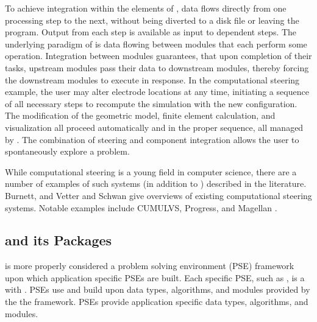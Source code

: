 To achieve integration within the elements of \SR{},
data flows  directly from one processing 
step to the next, without
being diverted to a disk file or leaving the program.  Output from
each step is available as input to dependent steps.  The underlying
paradigm of \SR{} is data flowing between modules that each perform
some operation.  Integration between modules guarantees, that upon
completion of their tasks, upstream modules pass their data to
downstream modules, thereby forcing the downstream modules to execute
in response.  In the computational steering example,  the user may alter
electrode locations at any time, initiating a sequence of all
necessary steps to recompute the simulation with the new
configuration.  The modification of the geometric model, finite
element calculation, and visualization all proceed automatically and
in the proper sequence, all managed by \SR{}.  The combination of
steering and component integration allows the user to
spontaneously explore a problem.

While computational steering is a young field in computer
science, there are a number of examples of such systems (in addition
to \SR{}) described in the literature.  Burnett\cite{MM:Bur94}, and
Vetter and Schwan\cite{MM:Vet96} give overviews of existing
computational steering systems. Notable examples include
CUMULVS\cite{MM:Gei96,MM:Koh97}, 
Progress\cite{MM:Vet95},  and Magellan\cite{MM:Vet97a}
.



\subsection{\SR{} and its Packages}
\label{sec:srversuspse}

\newcommand{\eabfig}{%
  \texttt{[image: Figures/SCIRunSoftSys.eps.gz]}
}
\begin{htmlonly}
  \newcommand{\eabfig}{%
    \htmladdimg[alt="SCIRun Software System Diagram"]{../Figures/SCIRunSoftSys.gif}
  }
\end{htmlonly}

\sr{} is more properly considered a problem solving environment (PSE)
framework upon which application specific PSEs are built.  Each
specific PSE, such as \BIOPSE{}, is a  with \sr{}.  PSEs
use and build upon data types, algorithms, and modules provided by the
the \sr{} framework.  PSEs provide application specific data types,
algorithms, and modules.

